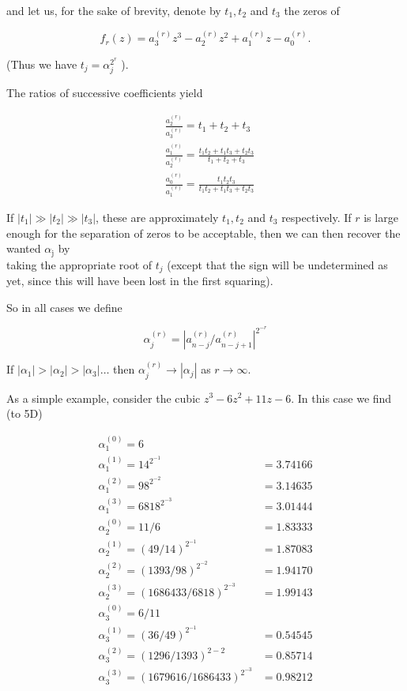 \documentclass[10pt]{article}
\begin{document}
and let us, for the sake of brevity, denote by $t_{1}, t_{2}$ and $t_{3}$ the zeros of

$$
f_{r}(z)=a_{3}^{(r)} z^{3}-a_{2}^{(r)} z^{2}+a_{1}^{(r)} z-a_{0}^{(r)} .
$$

(Thus we have $t_{j}=\alpha_{j}^{2^{r}}$ ).

The ratios of successive coefficients yield

$$
\begin{aligned}
& \frac{a_{2}^{(r)}}{a_{3}^{(r)}}=t_{1}+t_{2}+t_{3} \\
& \frac{a_{1}^{(r)}}{a_{2}^{(r)}}=\frac{t_{1} t_{2}+t_{1} t_{3}+t_{2} t_{3}}{t_{1}+t_{2}+t_{3}} \\
& \frac{a_{0}^{(r)}}{a_{1}^{(r)}}=\frac{t_{1} t_{2} t_{3}}{t_{1} t_{2}+t_{1} t_{3}+t_{2} t_{3}}
\end{aligned}
$$

If $\left|t_{1}\right| \gg\left|t_{2}\right| \gg\left|t_{3}\right|$, these are approximately $t_{1}, t_{2}$ and $t_{3}$ respectively. If $r$ is large enough for the separation of zeros to be acceptable, then we can then recover the wanted $\alpha_{\mathrm{j}}$ by\\
taking the appropriate root of $t_{j}$ (except that the sign will be undetermined as yet, since this will have been lost in the first squaring).

So in all cases we define

$$
\alpha_{j}^{(r)}=\left|a_{n-j}^{(r)} / a_{n-j+1}^{(r)}\right|^{2^{-r}}
$$

If $\left|\alpha_{1}\right|>\left|\alpha_{2}\right|>\left|\alpha_{3}\right| \ldots$ then $\alpha_{j}^{(r)} \rightarrow\left|\alpha_{j}\right|$ as $r \rightarrow \infty$.

As a simple example, consider the cubic $z^{3}-6 z^{2}+11 z-6$. In this case we find (to 5D)

$$
\begin{array}{ll}
\alpha_{1}^{(0)}=6 & \\
\alpha_{1}^{(1)}=14^{2^{-1}} & =3.74166 \\
\alpha_{1}^{(2)}=98^{2^{-2}} & =3.14635 \\
\alpha_{1}^{(3)}=6818^{2^{-3}} & =3.01444 \\
\alpha_{2}^{(0)}=11 / 6 & =1.83333 \\
\alpha_{2}^{(1)}=(49 / 14)^{2^{-1}} & =1.87083 \\
\alpha_{2}^{(2)}=(1393 / 98)^{2^{-2}} & =1.94170 \\
\alpha_{2}^{(3)}=(1686433 / 6818)^{2^{-3}} & =1.99143 \\
\alpha_{3}^{(0)}=6 / 11 & \\
\alpha_{3}^{(1)}=(36 / 49)^{2^{-1}} & =0.54545 \\
\alpha_{3}^{(2)}=(1296 / 1393)^{2-2} & =0.85714 \\
\alpha_{3}^{(3)}=(1679616 / 1686433)^{2^{-3}} & =0.98212
\end{array}
$$
\end{document}
